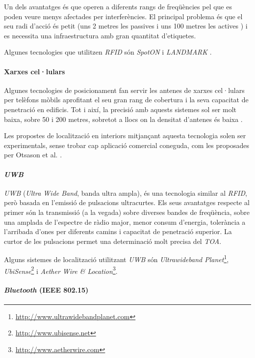 Un dels avantatges és que operen a diferents rangs de freqüències pel que es poden veure menys afectades per interferències. El principal problema és que el seu radi d'acció és petit (uns 2 metres les passives i uns 100 metres les actives \cite{chan}) i es necessita una infraestructura amb gran quantitat d'etiquetes.

Algunes tecnologies que utilitzen \textit{RFID} són \textit{SpotON} \cite{hightower} i \textit{LANDMARK} \cite{ni}.

\paragraph{Xarxes cel·lulars}

Algunes tecnologies de posicionament fan servir les antenes de xarxes cel·lulars per telèfons mòbils aprofitant el seu gran rang de cobertura i la seva capacitat de penetració en edificis. Tot i així, la precisió amb aquests sistemes sol ser molt baixa, sobre 50 i 200 metres, sobretot a llocs on la densitat d'antenes és baixa \cite{caffery}.

Les propostes de localització en interiors mitjançant aquesta tecnologia solen ser experimentals, sense trobar cap aplicació comercial coneguda, com les proposades per Otsason et al. \cite{otsason}.

\paragraph{\textit{UWB}}

\textit{UWB} (\textit{Ultra Wide Band}, banda ultra ampla), és una tecnologia similar al \textit{RFID}, però basada en l'emissió de pulsacions ultracurtes. Els seus avantatges respecte al primer són la transmissió (a la vegada) sobre diverses bandes de freqüència, sobre una amplada de l'espectre de ràdio major, menor consum d'energia, tolerància a l'arribada d'ones per diferents camins i capacitat de penetració superior. La curtor de les pulsacions permet una determinació molt precisa del \textit{TOA}.

Alguns sistemes de localització utilitzant \textit{UWB} són \textit{Ultrawideband Planet}\footnote{\url{http://www.ultrawidebandplanet.com}}, \textit{UbiSense}\footnote{\url{http://www.ubisense.net}} i \textit{Aether Wire \& Location}\footnote{\url{http://www.aetherwire.com}}.

\paragraph{\textit{Bluetooth} (IEEE 802.15)}

